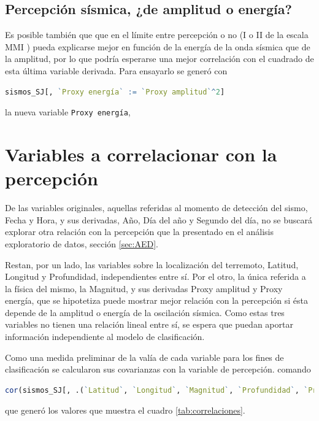 \documentclass[a4paper]{report}
\begin{document}
\subsection{Percepción sísmica, ¿de amplitud o energía?}
Es posible también que que en el límite entre percepción o no (I o II de la escala MMI \cite{noauthor_intensidad_2022}) pueda explicarse mejor en función de la energía de la onda sísmica que de la amplitud, por lo que podría esperarse una mejor correlación con el cuadrado de esta última variable derivada.
Para ensayarlo se generó con
\begin{lstlisting}[breaklines=true, language=R]
sismos_SJ[, `Proxy energía` := `Proxy amplitud`^2]
\end{lstlisting}
la nueva variable \lstinline[language = R]'Proxy energía', 


\section{Variables a correlacionar con la percepción}\label{sec:correlaciones}
De las variables originales, aquellas referidas al momento de detección del sismo, Fecha y Hora, y sus derivadas, Año, Día del año y Segundo del día, no se buscará explorar otra relación con la percepción que la presentado en el análisis exploratorio de datos, sección \ref{sec:AED}.

Restan, por un lado, las variables sobre la localización del terremoto, Latitud, Longitud y Profundidad, independientes entre sí.
Por el otro, la única referida a la física del mismo, la Magnitud, y sus derivadas Proxy amplitud y Proxy energía, que se hipotetiza puede mostrar mejor relación con la percepción si ésta depende de la amplitud o energía de la oscilación sísmica.
Como estas tres variables no tienen una relación lineal entre sí, se espera que puedan aportar información independiente al modelo de clasificación.

Como una medida preliminar de la valía de cada variable para los fines de clasificación se calcularon sus covarianzas con la variable de percepción.
 comando
\begin{lstlisting}[breaklines=true, language=R]
 cor(sismos_SJ[, .(`Latitud`, `Longitud`, `Magnitud`, `Profundidad`, `Proxy amplitud`, `Proxy energia`, Percibido)])
\end{lstlisting}	
 que generó los valores que muestra el cuadro \ref{tab:correlaciones}. 
\end{document}
